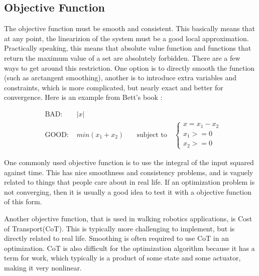 \subsection{Objective Function}

The objective function must be smooth and consistent. This basically means that at any point, the linearizion of the system must be a good local approximation. Practically speaking, this means that absolute value function and functions that return the maximum value of a set are absolutely forbidden. There are a few ways to get around this restriction. One option is to directly smooth the function (such as arctangent smoothing), another is to introduce extra variables and constraints, which is more complicated, but nearly exact and better for convergence. Here is an example from Bett's book \cite{betts2010practical}:

\begin{align}
	& \text{BAD: } & |x| &	\\

	& \text{GOOD: } &  min(x_1+x_2) & \quad

 \text{subject to} \quad 
  \begin{cases}
	x=x_1-x_2 \\
	x_1>=0 \\ 
	x_2>=0	
  \end{cases}

\end{align}


\par One commonly used objective function is to use the integral of the input squared against time. This has nice smoothness and consistency problems, and is vaguely related to things that people care about in real life. If an optimization problem is not converging, then it is usually a good idea to test it with a objective function of this form.

\par Another objective function, that is used in walking robotics applications, is Cost of Transport(CoT). This is typically more challenging to implement, but is directly related to real life. Smoothing is often required to use CoT in an optimization. CoT is also difficult for the optimization algorithm because it has a term for work, which typically is a product of some state and some actuator, making it very nonlinear.

